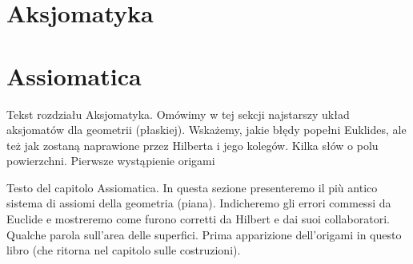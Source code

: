 %

\chapter{Aksjomatyka} %
\chapter{Assiomatica} %

Tekst rozdziału Aksjomatyka. \loremipsum %
Omówimy w tej sekcji najstarszy układ aksjomatów dla geometrii (płaskiej). %
Wskażemy, jakie błędy popełni Euklides, ale też jak zostaną naprawione przez Hilberta i jego kolegów. %
Kilka słów o polu powierzchni. %
Pierwsze wystąpienie origami  %

Testo del capitolo Assiomatica. \loremipsum %
In questa sezione presenteremo il più antico sistema di assiomi della geometria (piana). %
Indicheremo gli errori commessi da Euclide e mostreremo come furono corretti da Hilbert e dai suoi collaboratori. %
Qualche parola sull'area delle superfici. %
Prima apparizione dell'origami in questo libro (che ritorna nel capitolo sulle costruzioni). %











%